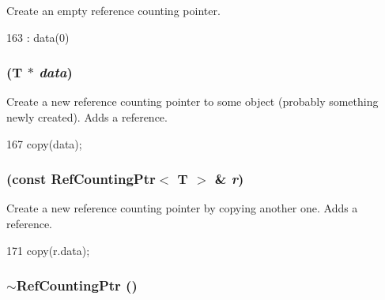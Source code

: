 Create an empty reference counting pointer. 


\begin{DoxyCode}
163 : data(0) {}
\end{DoxyCode}
\hypertarget{classRefCountingPtr_ab36d4c5bc63188c9877bf4d552ea8071}{
\subsubsection[{RefCountingPtr}]{ (T $\ast$ {\em data})}}
\label{classRefCountingPtr_ab36d4c5bc63188c9877bf4d552ea8071}
Create a new reference counting pointer to some object (probably something newly created). Adds a reference. 


\begin{DoxyCode}
167 { copy(data); }
\end{DoxyCode}
\hypertarget{classRefCountingPtr_a9049efc00f5d3c7a115a6d2e0fcec09c}{
\subsubsection[{RefCountingPtr}]{ (const {\bf RefCountingPtr}$<$ T $>$ \& {\em r})}}
\label{classRefCountingPtr_a9049efc00f5d3c7a115a6d2e0fcec09c}
Create a new reference counting pointer by copying another one. Adds a reference. 


\begin{DoxyCode}
171 { copy(r.data); }
\end{DoxyCode}
\hypertarget{classRefCountingPtr_a4ebce3855f9a62d273930390acdbde50}{
\subsubsection[{$\sim$RefCountingPtr}]{\setlength{\rightskip}{0pt plus 5cm}$\sim${\bf RefCountingPtr} ()}}
\label{classRefCountingPtr_a4ebce3855f9a62d273930390acdbde50}


